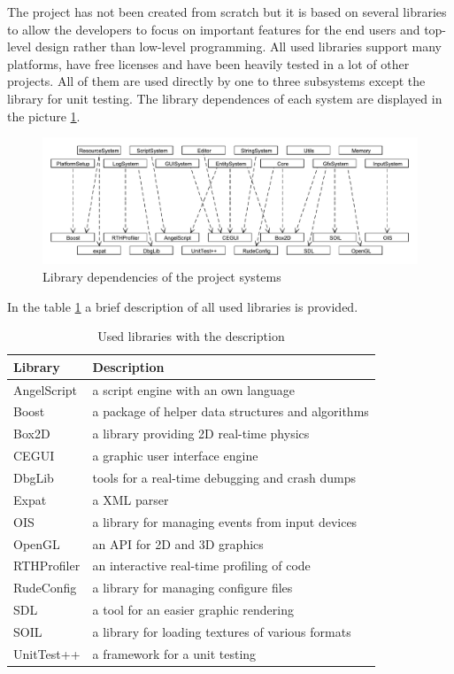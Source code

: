 \documentclass[a4paper, 12pt]{report}
\begin{document}
The project has not been created from scratch but it is based on several libraries to allow the developers to focus on important features for the end users and top-level design rather than low-level programming. All used libraries support many platforms, have free licenses and have been heavily tested in a lot of other projects. All of them are used directly by one to three subsystems except the library for unit testing. The library dependences of each system are displayed in the picture \ref{fig:library-dependence}.

\begin{figure}[htbp]
	\centering
		\includegraphics[width=1\textwidth]{LibraryDependence.pdf}
	\caption{Library dependencies of the project systems}
	\label{fig:library-dependence}
\end{figure}

In the table \ref{tab:library-list} a brief description of all used libraries is provided.

\begin{table}[htbp]
	\centering
		\begin{tabular}{|p{0.23\hsize}|p{0.70\hsize}|}
			\hline
			Library & Description\\
			\hline
			AngelScript\cite{angelscript} & a script engine with an own language\\
			Boost\cite{boost} & a package of helper data structures and algorithms\\
			Box2D\cite{box2d} & a library providing 2D real-time physics\\
			CEGUI\cite{cegui} & a graphic user interface engine\\
			DbgLib\cite{dbglib} & tools for a real-time debugging and crash dumps\\
			Expat\cite{expat} & a XML parser\\
			OIS\cite{ois} & a library for managing events from input devices\\
			OpenGL\cite{opengl} & an API for 2D and 3D graphics\\
			RTHProfiler\cite{rthprofiler} & an interactive real-time profiling of code\\
			RudeConfig\cite{rudeconfig} & a library for managing configure files\\
			SDL\cite{sdl} & a tool for an easier graphic rendering\\
			SOIL\cite{soil} & a library for loading textures of various formats\\
			UnitTest++\cite{unittest} & a framework for a unit testing\\
			\hline
		\end{tabular}
	\caption[Used libraries with the description]{Used libraries with the description}
	\label{tab:library-list}
\end{table}
\end{document}
